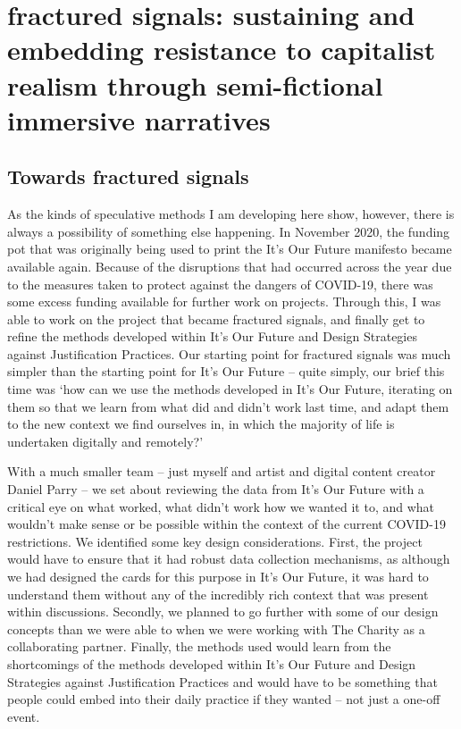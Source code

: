 \chapter{fractured signals: sustaining and embedding resistance to capitalist realism through semi-fictional immersive narratives}
\label{}

\section{Towards fractured signals}
\label{sec:}

As the kinds of speculative methods I am developing here show, however, there is always a possibility of something else happening. In November 2020, the funding pot that was originally being used to print the It’s Our Future manifesto became available again. Because of the disruptions that had occurred across the year due to the measures taken to protect against the dangers of COVID-19,  there was some excess funding available for further work on projects. Through this, I was able to work on the project that became fractured signals, and finally get to refine the methods developed within It’s Our Future and Design Strategies against Justification Practices. Our starting point for fractured signals was much simpler than the starting point for It’s Our Future – quite simply, our brief this time was ‘how can we use the methods developed in It’s Our Future, iterating on them so that we learn from what did and didn’t work last time, and adapt them to the new context we find ourselves in, in which the majority of life is undertaken digitally and remotely?’

With a much smaller team – just myself and artist and digital content creator Daniel Parry – we set about reviewing the data from It’s Our Future with a critical eye on what worked, what didn’t work how we wanted it to, and what wouldn’t make sense or be possible within the context of the current COVID-19 restrictions.  We identified some key design considerations. First, the project would have to ensure that it had robust data collection mechanisms, as although we had designed the cards for this purpose in It’s Our Future, it was hard to understand them without any of the incredibly rich context that was present within discussions. Secondly, we planned to go further with some of our design concepts than we were able to when we were working with The Charity as a collaborating partner. Finally, the methods used would learn from the shortcomings of the methods developed within It’s Our Future and Design Strategies against Justification Practices and would have to be something that people could embed into their daily practice if they wanted – not just a one-off event. 

